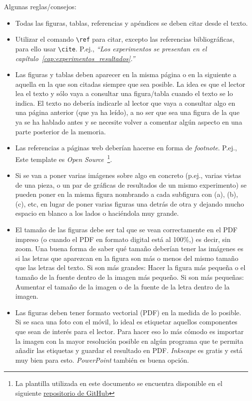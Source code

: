 \documentclass[a4paper,11pt,leqno, twoside]{memoir}
\begin{document}
Algunas reglas/consejos: 

\begin{itemize}
    \item Todas las figuras, tablas, referencias y apéndices se deben citar desde el texto.
    \item Utilizar el comando \lstinline{\ref} para citar, excepto las referencias bibliográficas, para ello usar \lstinline{\cite}. P.ej., \textit{``Los experimentos se presentan en el capítulo~\ref{cap:experimentos_resultados}.''}
    \item Las figuras y tablas deben aparecer en la misma página o en la siguiente a aquella en la que son citadas siempre que sea posible. La idea es que el lector lea el texto y sólo vaya a consultar una figura/tabla cuando el texto se lo indica. El texto no debería indicarle al lector que vaya a consultar algo en una página anterior (que ya ha leído), a no ser que sea una figura de la que ya se ha hablado antes y se necesite volver a comentar algún aspecto en una parte posterior de la memoria.
    \item Las referencias a páginas web deberían hacerse en forma de \textit{footnote}. P.ej., Este template es \textit{Open Source}~\footnote{La plantilla utilizada en este documento se encuentra disponible en el siguiente \href{https://github.com/jmgandarias/template_TFE}{repositorio de GitHub}}.
    \item Si se van a poner varias imágenes sobre algo en concreto (p.ej., varias vistas de una pieza, o un par de gráficas de resultados de un mismo experimento) se pueden poner en la misma figura nombrando a cada subfigura con (a), (b), (c), etc, en lugar de poner varias figuras una detrás de otra y dejando mucho espacio en blanco a los lados o haciéndola muy grande.
    \item El tamaño de las figuras debe ser tal que se vean correctamente en el PDF impreso (o cuando el PDF en formato digital está al 100\%,) es decir, sin zoom. Una buena forma de saber qué tamaño deberían tener las imágenes es si las letras que aparezcan en la figura son más o menos del mismo tamaño que las letras del texto. Si son más grandes: Hacer la figura más pequeña o el tamaño de la fuente dentro de la imagen más pequeño. Si son más pequeñas: Aumentar el tamaño de la imagen o de la fuente de la letra dentro de la imagen.
    \item Las figuras deben tener formato vectorial (PDF) en la medida de lo posible. Si se saca una foto con el móvil, lo ideal es etiquetar aquellos componentes que sean de interés para el lector. Para hacer eso lo más cómodo es importar la imagen con la mayor resolución posible en algún programa que te permita añadir las etiquetas y guardar el resultado en PDF. \textit{Inkscape} es gratis y está muy bien para esto. \textit{PowerPoint} también es buena opción. 

\end{itemize}
\end{document}
